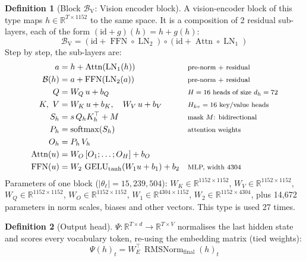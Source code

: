 \documentclass[10pt,a4paper]{article}
\newcommand{\op}[1]{\operatorname{#1}}
\theoremstyle{definition}
\newtheorem{definition}{Definition}[section]
\begin{document}
\begin{definition}[Block $\mathcal{B}_{\mathrm{V}}$: Vision encoder block]
A vision-encoder block of this type maps $h\in\mathbb{R}^{T\times 1152}$ to the same space. It is a composition of 2 residual sub-layers, each of the form $(\mathrm{id}+g)(h)=h+g(h)$:
\begin{equation}
  \mathcal{B}_{\mathrm{V}} = (\mathrm{id}+\op{FFN}\circ \op{LN}_{2})\circ(\mathrm{id}+\op{Attn}\circ \op{LN}_{1})
\end{equation}
Step by step, the sub-layers are:
\begin{align*}
  a &= h + \op{Attn}(\op{LN}_{1}(h)) && \text{\footnotesize pre-norm + residual} \\
  \mathcal{B}(h) &= a + \op{FFN}(\op{LN}_{2}(a)) && \text{\footnotesize pre-norm + residual} \\
  Q &= W_Q\,u + b_{Q} && \text{\footnotesize $H=16$ heads of size $d_h=72$} \\
  K,\ V &= W_K\,u + b_{K},\quad W_V\,u + b_{V} && \text{\footnotesize $H_{kv}=16$ key/value heads} \\
  S_h &= s\, Q_h K_h^{\top} + M && \text{\footnotesize mask $M$: bidirectional} \\
  P_h &= \op{softmax}(S_h) && \text{\footnotesize attention weights} \\
  O_h &= P_h\, V_h \\
  \op{Attn}(u) &= W_O\,[O_1;\dots;O_H] + b_O \\
  \op{FFN}(u) &= W_2\,\op{GELU}_{\tanh}(W_1 u + b_1) + b_2 && \text{\footnotesize MLP, width 4304}
\end{align*}
Parameters of one block ($|\theta_\ell|=15{,}239{,}504$): $W_K\in\mathbb{R}^{1152\times1152}$, $W_V\in\mathbb{R}^{1152\times1152}$, $W_Q\in\mathbb{R}^{1152\times1152}$, $W_O\in\mathbb{R}^{1152\times1152}$, $W_1\in\mathbb{R}^{4304\times1152}$, $W_2\in\mathbb{R}^{1152\times4304}$, plus 14,672 parameters in norm scales, biases and other vectors. This type is used 27 times.
\end{definition}
\begin{definition}[Output head]
$\Psi:\mathbb{R}^{T\times d}\to\mathbb{R}^{T\times V}$ normalises the last hidden state and scores every vocabulary token, re-using the embedding matrix (tied weights):
\begin{equation}
  \Psi(h)_t = W_E^{\top}\,\op{RMSNorm}_{\mathrm{final}}(h)_t
\end{equation}
\end{definition}
\end{document}
